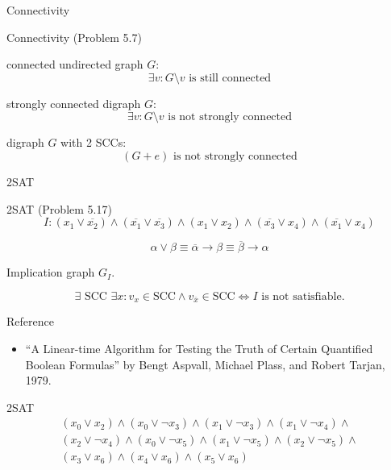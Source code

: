 \begin{frame}{Connectivity}
  \begin{exampleblock}{Connectivity (Problem 5.7)}
	\begin{description}[Example:]
	  \item[Prove:] connected undirected graph $G$: 
		\[
		  \exists v: G \setminus v \text{ is still connected}
		\]
	  \item[Example:] strongly connected digraph $G$:
		\[
		  \exists v: G \setminus v \text{ is not strongly connected}
		\]
	  \item[Example:] digraph $G$ with 2 SCCs:
		\[
		  (G + e) \text{ is not strongly connected}
		\]
	\end{description}
  \end{exampleblock}
\end{frame}
\begin{frame}{2SAT}
  \begin{exampleblock}{2SAT (Problem 5.17)}
	\[
	  I: (x_1 \lor \overline{x_2}) \land (\overline{x_1} \lor \overline{x_3}) \land (x_1 \lor x_2) \land (\overline{x_3} \lor x_4) \land (\overline{x_1} \lor x_4)
	\]
  \end{exampleblock}

  \pause
  \[
	\alpha \lor \beta \equiv \overline{\alpha} \to \beta \equiv \overline{\beta} \to \alpha
  \]

  \pause
  \begin{center}
	Implication graph $G_I$.
  \end{center}

  \pause
  \begin{theorem}
	\[
	  \exists \text{ SCC } \exists x: v_x \in \text{SCC} \land v_{\overline{x}} \in \text{SCC} \iff I \text{ is not satisfiable}.
	\]
  \end{theorem}

  \pause
  \begin{alertblock}{Reference}
	\begin{itemize}
	  \pause
	  \item ``A Linear-time Algorithm for Testing the Truth of Certain Quantified Boolean Formulas'' by Bengt Aspvall, Michael Plass, and Robert Tarjan, 1979.
	\end{itemize}
  \end{alertblock}
\end{frame}
\begin{frame}{2SAT}
  \begin{gather*}
	(x_0\lor x_2)\land(x_0\lor\lnot x_3)\land(x_1\lor\lnot x_3)\land(x_1\lor\lnot x_4)\land\\
	(x_2\lor\lnot x_4)\land (x_0\lor\lnot x_5)\land (x_1\lor\lnot x_5)\land (x_2\lor\lnot x_5)\land\\
	(x_3\lor x_6)\land (x_4\lor x_6)\land (x_5\lor x_6)
  \end{gather*}
  \begin{columns}
	  \pause
  \end{columns}
\end{frame}
